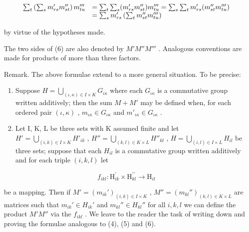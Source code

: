 \[
\begin{array}{r l} \sum_ {t} \left(\sum_ {s} m _ {r s} ^ {\prime} m _ {s t} ^ {\prime \prime}\right) m _ {t u} ^ {\prime \prime \prime} & = \sum_ {t} \sum_ {s} (m _ {r s} ^ {\prime} m _ {s t} ^ {\prime \prime}) m _ {t u} ^ {\prime \prime \prime} = \sum_ {s} \sum_ {t} m _ {r s} ^ {\prime} (m _ {s t} ^ {\prime \prime} m _ {t u} ^ {\prime \prime \prime}) \\ & = \sum_ {s} m _ {r s} ^ {\prime} \left(\sum_ {t} m _ {s t} ^ {\prime \prime} m _ {t u} ^ {\prime \prime \prime}\right) \end{array}
\]

by virtue of the hypotheses made.

The two sides of (6) are also denoted by \(M'M''M'''\) . Analogous conventions are made for products of more than three factors.

Remark. The above formulae extend to a more general situation. To be precise:

\begin{enumerate}
\def\labelenumi{(\alph{enumi})}
\item
  Suppose \(H = \bigcup_{(\iota, \kappa) \in I \times K} G_{\iota\kappa}\) where each \(G_{\iota\kappa}\) is a commutative group written additively; then the sum \(M + M'\) may be defined when, for each ordered pair \((\iota, \kappa)\) , \(m_{\iota\kappa} \in G_{\iota\kappa}\) and \(m'_{\iota\kappa} \in G_{\iota\kappa}\) .
\item
  Let I, K, L be three sets with K assumed finite and let \(H' = \bigcup_{(i, k) \in I \times K} H'_{ik}\) , \(H'' = \bigcup_{(k, l) \in K \times L} H''_{kl}\) , \(H = \bigcup_{(i, l) \in I \times L} H_{il}\) be three sets; suppose that each \(H_{il}\) is a commutative group written additively and for each triple \((i, k, l)\) let
\end{enumerate}

\[
f _ {i k l}: \mathrm{H} _ {i k} ^ {\prime} \times \mathrm{H} _ {k l} ^ {\prime \prime} \rightarrow \mathrm{H} _ {i l}
\]

be a mapping. Then if \(M' = (m_{ik}')_{(i,k) \in I \times K}\) , \(M'' = (m_{kl}'')_{(k,l) \in K \times L}\) are matrices such that \(m_{ik}' \in H_{ik}'\) and \(m_{kl}'' \in H_{kl}''\) for all \(i, k, l\) we can define the product \(M'M''\) via the \(f_{ikl}\) . We leave to the reader the task of writing down and proving the formulae analogous to (4), (5) and (6).

